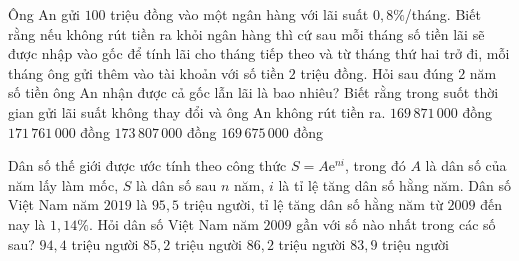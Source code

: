 \begin{ex}%
	Ông An gửi $100$ triệu đồng vào một ngân hàng với lãi suất $0{,}8\%$/tháng. Biết rằng nếu không rút tiền ra khỏi ngân hàng thì cứ sau mỗi tháng số tiền lãi sẽ được nhập vào gốc để tính lãi cho tháng tiếp theo và từ tháng thứ hai trở đi, mỗi tháng ông gửi thêm vào tài khoản với số tiền $2$ triệu đồng. Hỏi sau đúng $2$ năm số tiền ông An nhận được cả gốc lẫn lãi là bao nhiêu?  Biết rằng trong suốt thời gian gửi lãi suất không thay đổi và ông An không rút tiền ra.
	 \choice
		 {$169\,871\,000$ đồng}
		{\True $171\,761\,000$ đồng} 
		 {$173\,807\,000$ đồng}
		{$169\,675\,000$  đồng}
\end{ex}

\begin{ex}%
	Dân số thế giới được ước tính theo công thức $S=A\mathrm{e}^{ni}$, trong đó $A$ là dân số của năm lấy làm mốc, $S$ là dân số sau $n$ năm, $i$ là tỉ lệ tăng dân số hằng năm. Dân số Việt Nam năm $2019$ là $95{,}5$ triệu người, tỉ lệ tăng dân số hằng năm từ $2009$  đến nay là $1{,}14\%$. Hỏi dân số Việt Nam năm $2009$ gần với số nào nhất trong các số sau?
	 \choice
		{$94{,}4$  triệu người}
		 {\True $85{,}2$ triệu người}
		{$86{,}2$  triệu người}
		 {$83{,}9$ triệu người}
\end{ex}

